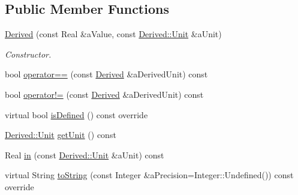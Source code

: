 \subsection*{Public Member Functions}
\begin{DoxyCompactItemize}
\item 
\hyperlink{classlibrary_1_1physics_1_1units_1_1_derived_a526996552af20a987c045ced9bd87fc7}{Derived} (const Real \&a\+Value, const \hyperlink{classlibrary_1_1physics_1_1units_1_1_derived_1_1_unit}{Derived\+::\+Unit} \&a\+Unit)
\begin{DoxyCompactList}\small\item\em Constructor. \end{DoxyCompactList}\item 
bool \hyperlink{classlibrary_1_1physics_1_1units_1_1_derived_a2cee9ae2cea2395bf21e377ee62eac67}{operator==} (const \hyperlink{classlibrary_1_1physics_1_1units_1_1_derived}{Derived} \&a\+Derived\+Unit) const
\item 
bool \hyperlink{classlibrary_1_1physics_1_1units_1_1_derived_a94357c9467421aabdc0a78423e2eef69}{operator!=} (const \hyperlink{classlibrary_1_1physics_1_1units_1_1_derived}{Derived} \&a\+Derived\+Unit) const
\item 
virtual bool \hyperlink{classlibrary_1_1physics_1_1units_1_1_derived_a26c20c57fc3a7c2fb2ff215d6d4687a2}{is\+Defined} () const override
\item 
\hyperlink{classlibrary_1_1physics_1_1units_1_1_derived_1_1_unit}{Derived\+::\+Unit} \hyperlink{classlibrary_1_1physics_1_1units_1_1_derived_a020b4ab6cb1d2ed73b01cde2bf1aab0e}{get\+Unit} () const
\item 
Real \hyperlink{classlibrary_1_1physics_1_1units_1_1_derived_a6ea039897b7a5905b096db05e392c484}{in} (const \hyperlink{classlibrary_1_1physics_1_1units_1_1_derived_1_1_unit}{Derived\+::\+Unit} \&a\+Unit) const
\item 
virtual String \hyperlink{classlibrary_1_1physics_1_1units_1_1_derived_a3626d6c77e6753f44232067856fde9d1}{to\+String} (const Integer \&a\+Precision=Integer\+::\+Undefined()) const override
\end{DoxyCompactItemize}
